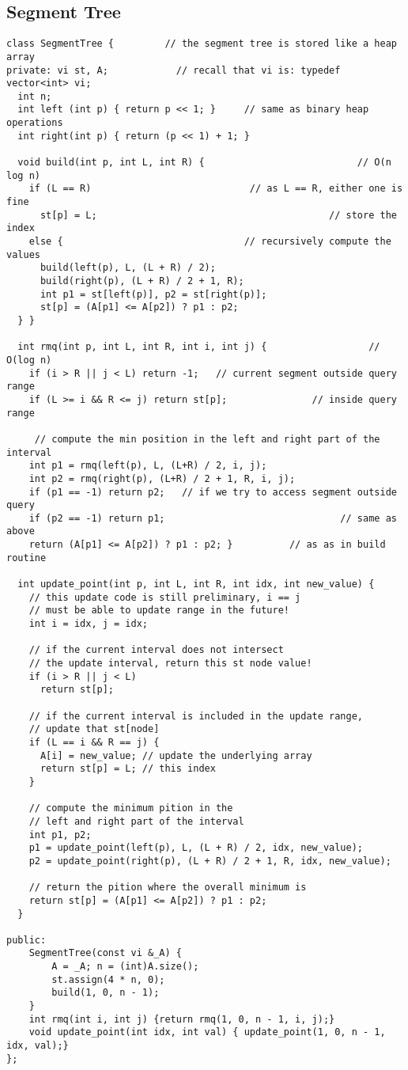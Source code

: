 \documentclass[letterpaper]{article}
\begin{document}
\subsection{Segment Tree}
\begin{lstlisting}
class SegmentTree {         // the segment tree is stored like a heap array
private: vi st, A;            // recall that vi is: typedef vector<int> vi;
  int n;
  int left (int p) { return p << 1; }     // same as binary heap operations
  int right(int p) { return (p << 1) + 1; }

  void build(int p, int L, int R) {                           // O(n log n)
    if (L == R)                            // as L == R, either one is fine
      st[p] = L;                                         // store the index
    else {                                // recursively compute the values
      build(left(p), L, (L + R) / 2);
      build(right(p), (L + R) / 2 + 1, R);
      int p1 = st[left(p)], p2 = st[right(p)];
      st[p] = (A[p1] <= A[p2]) ? p1 : p2;
  } }

  int rmq(int p, int L, int R, int i, int j) {                  // O(log n)
    if (i > R || j < L) return -1;   // current segment outside query range
    if (L >= i && R <= j) return st[p];               // inside query range

     // compute the min position in the left and right part of the interval
    int p1 = rmq(left(p), L, (L+R) / 2, i, j);
    int p2 = rmq(right(p), (L+R) / 2 + 1, R, i, j);
    if (p1 == -1) return p2;   // if we try to access segment outside query
    if (p2 == -1) return p1;                               // same as above
    return (A[p1] <= A[p2]) ? p1 : p2; }          // as as in build routine

  int update_point(int p, int L, int R, int idx, int new_value) {
    // this update code is still preliminary, i == j
    // must be able to update range in the future!
    int i = idx, j = idx;

    // if the current interval does not intersect 
    // the update interval, return this st node value!
    if (i > R || j < L)
      return st[p];

    // if the current interval is included in the update range,
    // update that st[node]
    if (L == i && R == j) {
      A[i] = new_value; // update the underlying array
      return st[p] = L; // this index
    }

    // compute the minimum pition in the 
    // left and right part of the interval
    int p1, p2;
    p1 = update_point(left(p), L, (L + R) / 2, idx, new_value);
    p2 = update_point(right(p), (L + R) / 2 + 1, R, idx, new_value);

    // return the pition where the overall minimum is
    return st[p] = (A[p1] <= A[p2]) ? p1 : p2;
  }

public:
	SegmentTree(const vi &_A) {
		A = _A; n = (int)A.size();
		st.assign(4 * n, 0);
		build(1, 0, n - 1);
	}
	int rmq(int i, int j) {return rmq(1, 0, n - 1, i, j);}
	void update_point(int idx, int val) { update_point(1, 0, n - 1, idx, val);}
};
\end{lstlisting}
\end{document}
